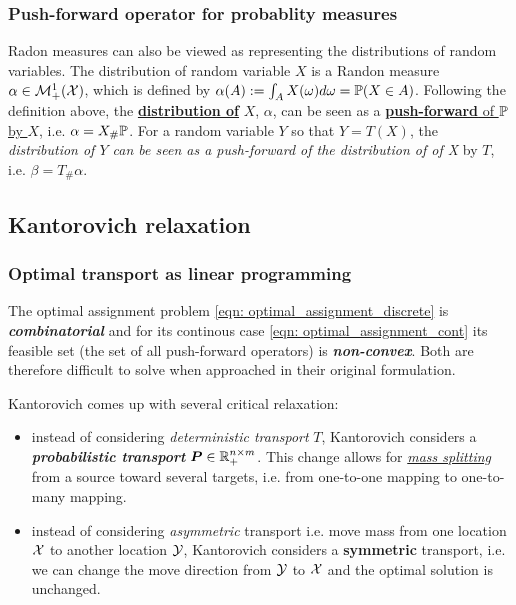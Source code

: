 \documentclass[11pt]{article}
\begin{document}
\subsubsection{Push-forward operator for probablity measures}
Radon measures can also be viewed as representing the distributions of random variables. The distribution of random variable $X$ is a Randon measure $\alpha \in {\mathcal M}_{+}^{1}({\mathcal X})$, which is defined by $\alpha(A) := \int_A X(\omega) d\omega = {\mathbb P}(X \in A)$. Following the definition above, the \underline{\textbf{distribution of}} $X$, $\alpha$, can be seen as a \underline{\textbf{push-forward} of ${\mathbb P}$ by $X$}, i.e.  \underline{$\alpha = X_{\#}{\mathbb P}$}. For a random variable $Y$ so that  \underline{$Y= T(X)$}, the \emph{distribution of $Y$ can be seen as a push-forward of the distribution of of X} by $T$, i.e.  \underline{$\beta = T_{\#}\alpha$}.

\subsection{Kantorovich relaxation}
\subsubsection{Optimal transport as linear programming}
The optimal assignment problem \eqref{eqn: optimal_assignment_discrete}  is \emph{\textbf{combinatorial}} and for its continous case \eqref{eqn: optimal_assignment_cont} its feasible set (the set of all push-forward operators) is \emph{\textbf{non-convex}}. Both are therefore difficult to solve when approached in their original formulation.

Kantorovich comes up with several critical relaxation: 
\begin{itemize}
\item instead of considering \emph{deterministic transport} $T$, Kantorovich considers a \textbf{\emph{probabilistic transport}} $\boldsymbol{P} \in {\mathbb R}_{+}^{n \times m}$. This change allows for \underline{\emph{mass splitting}} from a source toward several targets, i.e. from one-to-one mapping to one-to-many mapping.  

\item instead of considering \emph{asymmetric} transport i.e. move mass from one location ${\mathcal X}$ to another location ${\mathcal Y}$, Kantorovich considers a \textbf{symmetric}  transport, i.e. we can change the move direction from ${\mathcal Y}$ to ${\mathcal X}$ and the optimal solution is unchanged. 
\end{itemize}
\end{document}
